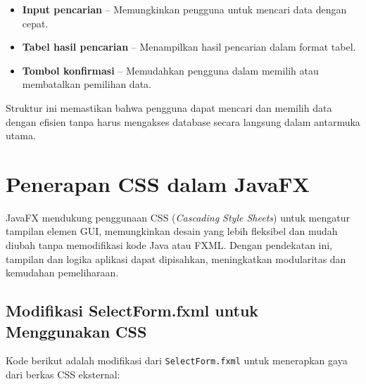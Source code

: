 \begin{enumerate}
	\begin{itemize}
		\item \textbf{Input pencarian} – Memungkinkan pengguna untuk mencari data dengan cepat.
		\item \textbf{Tabel hasil pencarian} – Menampilkan hasil pencarian dalam format tabel.
		\item \textbf{Tombol konfirmasi} – Memudahkan pengguna dalam memilih atau membatalkan pemilihan data.
	\end{itemize}
	
	Struktur ini memastikan bahwa pengguna dapat mencari dan memilih data dengan efisien tanpa harus mengakses database secara langsung dalam antarmuka utama.
\end{enumerate}




\section{Penerapan CSS dalam JavaFX}

JavaFX mendukung penggunaan CSS (\textit{Cascading Style Sheets}) untuk mengatur tampilan elemen GUI, memungkinkan desain yang lebih fleksibel dan mudah diubah tanpa memodifikasi kode Java atau FXML. Dengan pendekatan ini, tampilan dan logika aplikasi dapat dipisahkan, meningkatkan modularitas dan kemudahan pemeliharaan.

\subsection{Modifikasi SelectForm.fxml untuk Menggunakan CSS}

Kode berikut adalah modifikasi dari \texttt{SelectForm.fxml} untuk menerapkan gaya dari berkas CSS eksternal:

